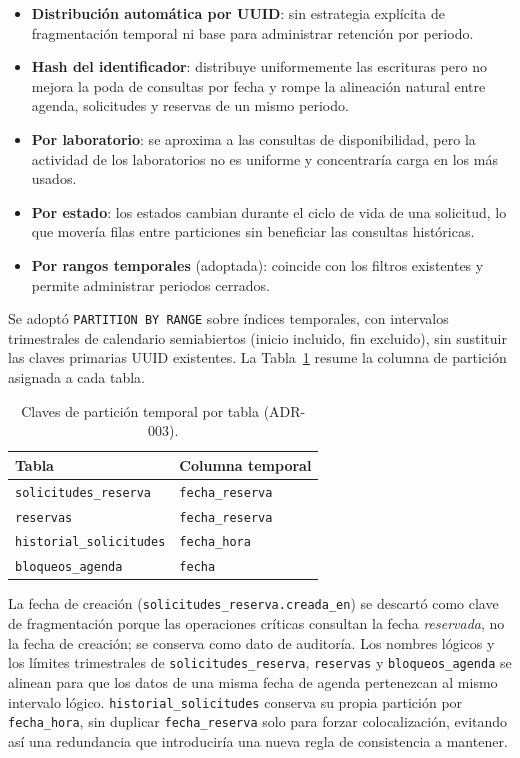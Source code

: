 \documentclass[10pt,twocolumn]{article}
\begin{document}
\begin{itemize}[leftmargin=*,itemsep=1pt]
  \item \textbf{Distribución automática por UUID}: sin estrategia explícita
  de fragmentación temporal ni base para administrar retención por periodo.
  \item \textbf{Hash del identificador}: distribuye uniformemente las
  escrituras pero no mejora la poda de consultas por fecha y rompe la
  alineación natural entre agenda, solicitudes y reservas de un mismo
  periodo.
  \item \textbf{Por laboratorio}: se aproxima a las consultas de
  disponibilidad, pero la actividad de los laboratorios no es uniforme y
  concentraría carga en los más usados.
  \item \textbf{Por estado}: los estados cambian durante el ciclo de vida
  de una solicitud, lo que movería filas entre particiones sin beneficiar
  las consultas históricas.
  \item \textbf{Por rangos temporales} (adoptada): coincide con los
  filtros existentes y permite administrar periodos cerrados.
\end{itemize}

Se adoptó \texttt{PARTITION BY RANGE} sobre índices temporales, con
intervalos trimestrales de calendario semiabiertos (inicio incluido, fin
excluido), sin sustituir las claves primarias UUID existentes. La
Tabla~\ref{tab:fragmentacion} resume la columna de partición asignada a
cada tabla.

\begin{table}[t]
\centering
\caption{Claves de partición temporal por tabla (ADR-003).}
\label{tab:fragmentacion}
\small
\begin{tabular}{@{}ll@{}}
\toprule
\textbf{Tabla} & \textbf{Columna temporal} \\
\midrule
\texttt{solicitudes\_reserva} & \texttt{fecha\_reserva} \\
\texttt{reservas} & \texttt{fecha\_reserva} \\
\texttt{historial\_solicitudes} & \texttt{fecha\_hora} \\
\texttt{bloqueos\_agenda} & \texttt{fecha} \\
\bottomrule
\end{tabular}
\end{table}

La fecha de creación (\texttt{solicitudes\_reserva.}\allowbreak\texttt{creada\_en}) se descartó
como clave de fragmentación porque las operaciones críticas consultan la
fecha \emph{reservada}, no la fecha de creación; se conserva como dato de
auditoría. Los nombres lógicos y los límites trimestrales de
\texttt{solicitudes\_reserva}, \texttt{reservas} y \texttt{bloqueos\_agenda}
se alinean para que los datos de una misma fecha de agenda pertenezcan al
mismo intervalo lógico. \texttt{historial\_solicitudes} conserva su propia
partición por \texttt{fecha\_hora}, sin duplicar \texttt{fecha\_reserva}
solo para forzar colocalización, evitando así una redundancia que
introduciría una nueva regla de consistencia a mantener.
\end{document}
